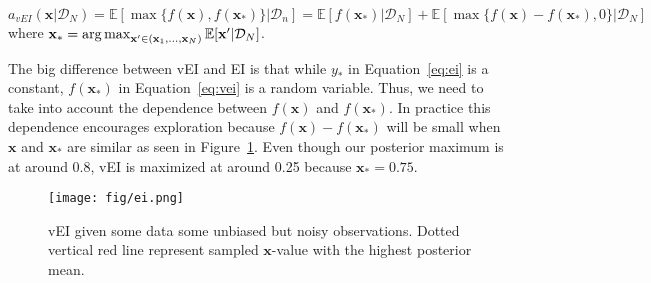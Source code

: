 \begin{definition}[vEI]
    \begin{equation}
        \label{eq:vei}
        a_{vEI}(\mathbf{x} | \mathcal{D}_N) = \mathbb{E}[\max \{ f(\mathbf{x}), f(\mathbf{x}_*) \} | \mathcal{D}_n]
        = \mathbb{E}[f(\mathbf{x}_*) | \mathcal{D}_N] + \mathbb{E}[\max \{ f(\mathbf{x}) - f(\mathbf{x}_*), 0 \} | \mathcal{D}_N]
    \end{equation}
    where $\mathbf{x}_* = \operatorname*{arg\,max}_{\mathbf{x'} \in (\mathbf{x}_1, \ldots, \mathbf{x}_N)} \mathbb{E}[\mathbf{x'} | \mathcal{D}_N]$.
\end{definition}

The big difference between vEI and EI is that while $y_*$ in Equation~\ref{eq:ei} is a constant, $f(\mathbf{x}_*)$ in Equation~\ref{eq:vei} is a random variable.
Thus, we need to take into account the dependence between $f(\mathbf{x})$ and $f(\mathbf{x}_*)$.
In practice this dependence encourages exploration because $f(\mathbf{x}) - f(\mathbf{x}_*)$ will be small when $\mathbf{x}$ and $\mathbf{x}_*$ are similar as seen in Figure~\ref{fig:ei}.
Even though our posterior maximum is at around 0.8, vEI is maximized at around 0.25 because $\mathbf{x}_* = 0.75$.

\begin{figure}[h]
    \centering
    \texttt{[image: fig/ei.png]}
    \caption{vEI given some data some unbiased but noisy observations.
        Dotted vertical red line represent sampled $\mathbf{x}$-value with the highest posterior mean.
    }
    \label{fig:ei}
\end{figure}

